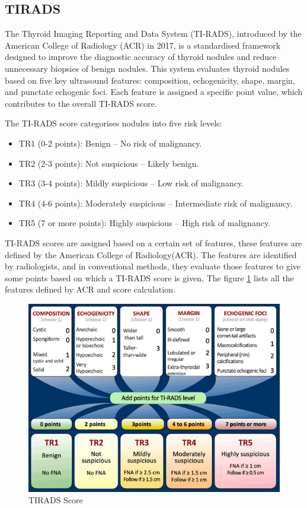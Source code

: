     \subsection{TIRADS}
    \noindent
    The Thyroid Imaging Reporting and Data System (TI-RADS), introduced by the American College of Radiology (ACR) in 2017, is a standardised framework designed to improve the diagnostic accuracy of thyroid nodules and reduce unnecessary biopsies of benign nodules. This system evaluates thyroid nodules based on five key ultrasound features: composition, echogenicity, shape, margin, and punctate echogenic foci. Each feature is assigned a specific point value, which contributes to the overall TI-RADS score. \par \noindent
    \noindent The TI-RADS score categorises nodules into five risk levels: 
    \begin{itemize}
    \item TR1 (0-2 points): Benign – No risk of malignancy.
    \item TR2 (2-3 points): Not suspicious – Likely benign.
    \item TR3 (3-4 points): Mildly suspicious – Low risk of malignancy.
    \item TR4 (4-6 points): Moderately suspicious – Intermediate risk of malignancy.
    \item TR5 (7 or more points): Highly suspicious – High risk of malignancy.
    \end{itemize}

    \noindent
    TI-RADS scores are assigned based on a certain set of features, these features are defined by the American College of Radiology(ACR). The features are identified by radiologists, and in conventional methods, they evaluate those features to give some points based on which a TI-RADS score is given. The figure \ref{fig:tiradsACR} lists all the features defined by ACR and score calculation.

    \begin{figure}[H]
        \centering
        \includegraphics[width=1\linewidth]{images/tiradsACR.png}
        \caption{TIRADS Score}
        \label{fig:tiradsACR}
    \end{figure}

